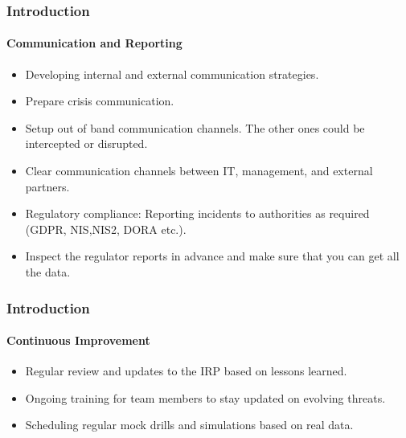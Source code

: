 \begin{frame}
	\frametitle{Introduction}
	\framesubtitle{Communication and Reporting}
	\begin{itemize}
    		\item Developing internal and external communication strategies.
    		\item Prepare crisis communication.
    		\item Setup out of band communication channels. The other ones could be intercepted or disrupted.
    		\item Clear communication channels between IT, management, and external partners.
    		\item Regulatory compliance: Reporting incidents to authorities as required (GDPR, NIS,NIS2, DORA etc.).
            \item Inspect the regulator reports in advance and make sure that you can get all the data.
	\end{itemize}
\end{frame}

\begin{frame}
	\frametitle{Introduction}
	\framesubtitle{Continuous Improvement}
	\begin{itemize}
    		\item Regular review and updates to the IRP based on lessons learned.
    		\item Ongoing training for team members to stay updated on evolving threats.
   		\item Scheduling regular mock drills and simulations based on real data.
   	\end{itemize}
\end{frame}


